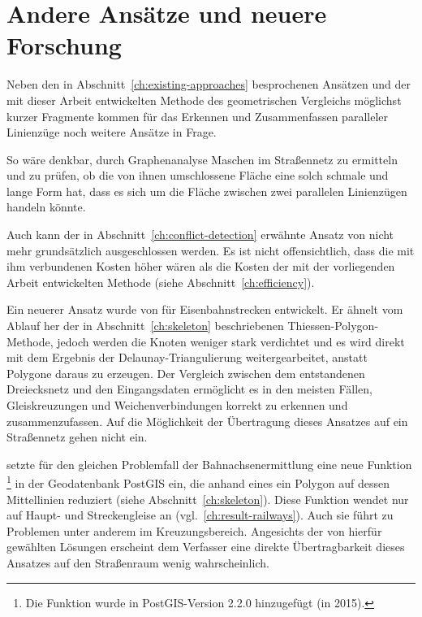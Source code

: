 \documentclass[../main/thesis.tex]{subfiles}
\begin{document}
\section{Andere Ansätze und neuere Forschung}
\label{ch:recent-research}

Neben den in Abschnitt~\ref{ch:existing-approaches} besprochenen Ansätzen und der mit dieser Arbeit entwickelten Methode des geometrischen Vergleichs möglichst kurzer Fragmente kommen für das Erkennen und Zusammenfassen paralleler Linienzüge noch weitere Ansätze in Frage.

So wäre denkbar, durch Graphenanalyse Maschen im Straßennetz zu ermitteln und zu prüfen, ob die von ihnen umschlossene Fläche eine solch schmale und lange Form hat, dass es sich um die Fläche zwischen zwei parallelen Linienzügen handeln könnte.

Auch kann der in Abschnitt~\ref{ch:conflict-detection} erwähnte Ansatz von \citeauthor{KP98} nicht mehr grundsätzlich ausgeschlossen werden.
Es ist nicht offensichtlich, dass die mit ihm verbundenen Kosten höher wären als die Kosten der mit der vorliegenden Arbeit entwickelten Methode (siehe Abschnitt~\ref{ch:efficiency}).

Ein neuerer Ansatz wurde von \citeauthor{CTGV14} für Eisenbahnstrecken entwickelt.
Er ähnelt vom Ablauf her der in Abschnitt~\ref{ch:skeleton} beschriebenen Thiessen-Polygon-Methode, jedoch werden die Knoten weniger stark verdichtet und es wird direkt mit dem Ergebnis der Delaunay-Triangulierung weitergearbeitet, anstatt Polygone daraus zu erzeugen.
Der Vergleich zwischen dem entstandenen Dreiecksnetz und den Eingangsdaten ermöglicht es in den meisten Fällen, Gleiskreuzungen und Weichenverbindungen korrekt zu erkennen und zusammenzufassen.
Auf die Möglichkeit der Übertragung dieses Ansatzes auf ein Straßennetz gehen \citeauthor{CTGV14} nicht ein. 

 setzte für den gleichen Problemfall der Bahnachsenermittlung eine neue Funktion%
\footnote{Die Funktion  wurde in PostGIS-Version 2.2.0 hinzugefügt (in 2015).}
in der Geodatenbank PostGIS ein, die anhand eines  ein Polygon auf dessen Mittellinien reduziert (siehe Abschnitt~\ref{ch:skeleton}).
Diese Funktion wendet \citeauthor{Mat17} nur auf Haupt- und Streckengleise an (vgl.~\ref{ch:result-railways}).
Auch sie führt zu Problemen unter anderem im Kreuzungsbereich.
Angesichts der von \citeauthor{Mat17} hierfür gewählten Lösungen erscheint dem Verfasser eine direkte Übertragbarkeit dieses Ansatzes auf den Straßenraum wenig wahrscheinlich. 
\end{document}
